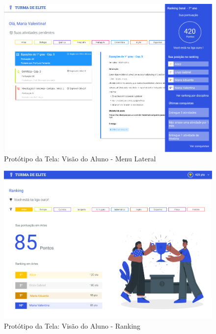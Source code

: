 \documentclass[
    12pt,               %
    openright,          %
    oneside,
    a4paper,            %
    english,            %
    brazil              %
    ]{ifsp-spo-inf-ctds} %
\begin{document}
\begin{apendicesenv}
\begin{figure}[htb]
    \centering
	\includegraphics[width=16cm]{imagens/Aluno-MenuLateral.png}
	\caption{\label{fig:menu-lateral} Protótipo da Tela: Visão do Aluno - Menu Lateral}
\end{figure}
\FloatBarrier

\begin{figure}[htb]
    \centering
	\includegraphics[width=16cm]{imagens/Aluno-Ranking.png}
	\caption{\label{fig:ranking} Protótipo da Tela: Visão do Aluno - Ranking}
\end{figure}
\FloatBarrier


\end{apendicesenv}
\end{document}
